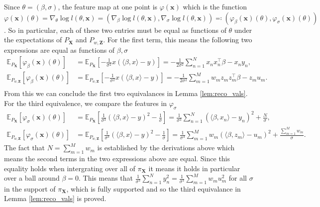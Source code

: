 \documentclass[hyperref]{article}
\theoremstyle{plain}
\theoremstyle{remark}
\newcommand{\bx}{\mathbf{x}}
\newcommand{\bX}{\mathbf{X}}
\newcommand{\bZ}{\mathbf{Z}}
\newcommand{\bbE}{\mathbb{E}}
\begin{document}
Since $\theta = (\beta,\sigma)$, the feature map at one point is $\varphi(\bx)$ which is the function $\varphi(\bx)(\theta) = \nabla_{\theta}\log l(\theta,\bx) = (\nabla_{\beta}\log l(\theta,\bx),\nabla_{\sigma}\log l(\theta,\bx))\eqqcolon (\varphi_{\beta}(\bx)(\theta),\varphi_{\sigma}(\bx)(\theta))$. So in particular, each of these two entries must be equal as functions of $\theta$ under the expectations of $P_{\bX}$ and $P_{w,\bZ}$. For the first term, this means the following two expressions are equal as functions of $\beta,\sigma$
\begin{align*}
	\bbE_{P_{\bX}}[\varphi_{\beta}(\bx)(\theta)] & = \bbE_{P_{\bX}}\left[-\frac{1}{\sigma^{2}}x(\langle \beta, x\rangle - y)\right] = -\frac{1}{2\sigma^{2}}\sum_{n=1}^{N}x_{n}x_{n}^{\top}\beta - x_{n}y_{n}, \\
	\bbE_{P_{w,\bZ}}[\varphi_{\beta}(\bx)(\theta)] & = \bbE_{P_{w,\bZ}}\left[-\frac{1}{\sigma^{2}}x(\langle \beta, x\rangle - y)\right] = -\frac{1}{2\sigma^{2}}\sum_{m=1}^{M}w_{m}z_{m}z_{m}^{\top}\beta - z_{m}u_{m}. \\
\end{align*}
From this we can conclude the first two equivalances in Lemma \ref{lem:reco_vals}. For the third equivalence, we compare the features in $\varphi_{\sigma}$
\begin{align*}
	\bbE_{P_{\bX}}[\varphi_{\sigma}(\bx)(\theta)] & = \bbE_{P_{\bX}}\left[\frac{1}{\sigma^{3}}(\langle \beta, x\rangle - y)^{2} - \frac{1}{\sigma}\right] = \frac{1}{\sigma^{3}}\sum_{n=1}^{N}(\langle \beta, x_{n}\rangle - y_{n})^{2} + \frac{N}{\sigma}, \\
	\bbE_{P_{w,\bZ}}[\varphi_{\sigma}(\bx)(\theta)] & = \bbE_{P_{w,\bZ}}\left[\frac{1}{\sigma^{3}}(\langle \beta, x\rangle - y)^{2} - \frac{1}{\sigma}\right] = \frac{1}{\sigma^{3}}\sum_{m=1}^{M}w_{m}(\langle \beta, z_{m}\rangle - u_{m})^{2} + \frac{\sum_{m=1}^{M}w_{m}}{\sigma}.
\end{align*}
The fact that $N=\sum_{m=1}^{M}w_{m}$ is established by the derivations above which means the second terms in the two expressions above are equal. Since this equality holds when intergrating over all of $\pi_{\bX}$ it means it holds in particular over a ball around $\beta = 0$. This means that $\frac{1}{\sigma^{3}}\sum_{n=1}^{N}y_{n}^{2} = \frac{1}{\sigma^{3}}\sum_{m=1}^{M}w_{m}u_{m}^{2}$ for all $\sigma$ in the support of $\pi_{\bX}$, which is fully supported and so the third equivalance in Lemma \ref{lem:reco_vals} is proved. 
\end{document}
